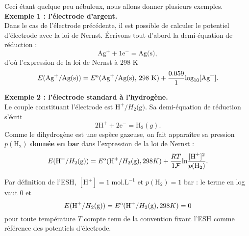 \documentclass[11pt,a4paper]{report}
\begin{document}
Ceci étant quelque peu nébuleux, nous allons donner plusieurs exemples.\\

\textbf{Exemple 1 : l'électrode d'argent.}\\ 
Dans le cas de l'électrode précédente, il est possible de calculer le potentiel d'électrode avec la loi de Nernst. Écrivons tout d'abord la demi-équation de réduction :
\begin{equation}
	\text{Ag}^+ + 1\text{e}^- = \text{Ag(s)},
\end{equation}
d'où l'expression de la loi de Nernst à 298 K
\begin{equation}
	E(\text{Ag}^+/\text{Ag(s)}) = E\textsuperscript{o}(\text{Ag}^+/\text{Ag(s), 298 K}) + \frac{0.059}{1} \text{log}_{10}[\text{Ag}^{+}].\\
\end{equation}

\textbf{Exemple 2 : l'électrode standard à l'hydrogène.}\\
Le couple constituant l'électrode est $\text{H}^+/H_2\text{(g)}$. Sa demi-équation de réduction s'écrit
\begin{equation}
	2\text{H}^+ + 2\text{e}^- = \text{H}_2(g).
\end{equation}
Comme le dihydrogène est une espèce gazeuse, on fait apparaître sa pression $p(\text{H}_2)$ \textbf{donnée en bar} dans l'expression de la loi de Nernst :
\begin{equation}
	E(\text{H}^+/H_2\text{(g)}) = E\textsuperscript{o}(\text{H}^+/H_2\text{(g)}, 298 K) + \frac{RT}{1\mathcal{F}}\text{ln} \frac{[\text{H}^+]^2}{p(\text{H}_2)}.
\end{equation}

Par définition de l'ESH, $[\text{H}^+] = 1\;\text{mol.L}^{-1}$ et $p(\text{H}_2) = 1$ bar : le terme en log vaut 0 et
\begin{equation}
	E(\text{H}^+/H_2\text{(g)}) = E\textsuperscript{o}(\text{H}^+/H_2\text{(g)}, 298 K) = 0 
\end{equation}
pour toute température $T$ compte tenu de la convention fixant l'ESH comme référence des potentiels d'électrode.\\
\end{document}
